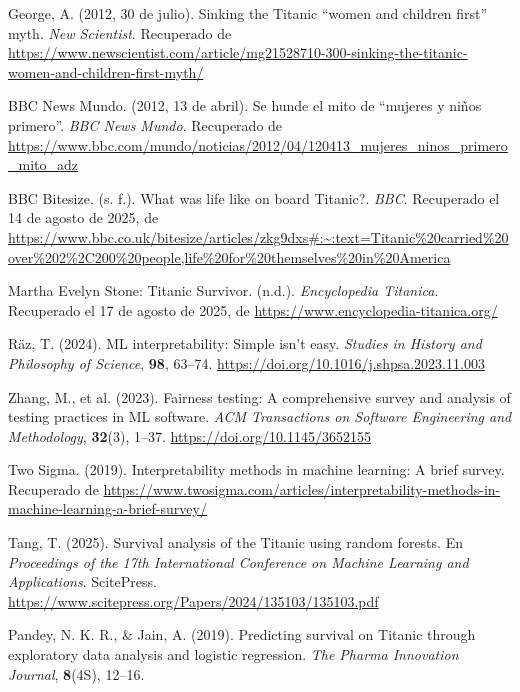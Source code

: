 \documentclass[sjournal]{IEEEtran}
\begin{document}
\begin{itemize}
\begin{thebibliography}{99}
George, A. (2012, 30 de julio). 
Sinking the Titanic “women and children first” myth. 
\textit{New Scientist}. Recuperado de 
\url{https://www.newscientist.com/article/mg21528710-300-sinking-the-titanic-women-and-children-first-myth/}

BBC News Mundo. (2012, 13 de abril). 
Se hunde el mito de “mujeres y niños primero”. 
\textit{BBC News Mundo}. Recuperado de 
\url{https://www.bbc.com/mundo/noticias/2012/04/120413_mujeres_ninos_primero_mito_adz}

BBC Bitesize. (s. f.). 
What was life like on board Titanic?. 
\textit{BBC}. Recuperado el 14 de agosto de 2025, de 
\url{https://www.bbc.co.uk/bitesize/articles/zkg9dxs#:~:text=Titanic%20carried%20over%202%2C200%20people,life%20for%20themselves%20in%20America}

Martha Evelyn Stone: Titanic Survivor. (n.d.). 
\textit{Encyclopedia Titanica}. Recuperado el 17 de agosto de 2025, de 
\url{https://www.encyclopedia-titanica.org/}


\end{thebibliography}
\begin{thebibliography}{99}

R{\"a}z, T. (2024). 
ML interpretability: Simple isn’t easy. 
\textit{Studies in History and Philosophy of Science}, \textbf{98}, 63–74. 
\url{https://doi.org/10.1016/j.shpsa.2023.11.003}

Zhang, M., et al. (2023). 
Fairness testing: A comprehensive survey and analysis of testing practices in ML software. 
\textit{ACM Transactions on Software Engineering and Methodology}, \textbf{32}(3), 1–37. 
\url{https://doi.org/10.1145/3652155}

Two Sigma. (2019). 
Interpretability methods in machine learning: A brief survey. 
Recuperado de \url{https://www.twosigma.com/articles/interpretability-methods-in-machine-learning-a-brief-survey/}

Tang, T. (2025). 
Survival analysis of the Titanic using random forests. 
En \textit{Proceedings of the 17th International Conference on Machine Learning and Applications}. ScitePress. 
\url{https://www.scitepress.org/Papers/2024/135103/135103.pdf}

Pandey, N. K. R., \& Jain, A. (2019). 
Predicting survival on Titanic through exploratory data analysis and logistic regression. 
\textit{The Pharma Innovation Journal}, \textbf{8}(4S), 12–16.


\end{thebibliography}
\end{itemize}
\end{document}
